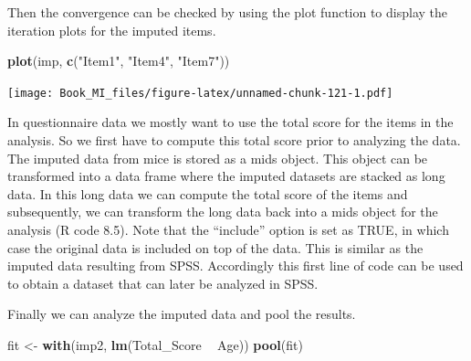 \documentclass[
]{book}
\newenvironment{Shaded}{\begin{snugshade}}{\end{snugshade}}
\newcommand{\DataTypeTok}[1]{\textcolor[rgb]{0.13,0.29,0.53}{#1}}
\newcommand{\DecValTok}[1]{\textcolor[rgb]{0.00,0.00,0.81}{#1}}
\newcommand{\KeywordTok}[1]{\textcolor[rgb]{0.13,0.29,0.53}{\textbf{#1}}}
\newcommand{\NormalTok}[1]{#1}
\newcommand{\OperatorTok}[1]{\textcolor[rgb]{0.81,0.36,0.00}{\textbf{#1}}}
\newcommand{\OtherTok}[1]{\textcolor[rgb]{0.56,0.35,0.01}{#1}}
\newcommand{\StringTok}[1]{\textcolor[rgb]{0.31,0.60,0.02}{#1}}
\begin{document}
Then the convergence can be checked by using the plot function to display the iteration plots for the imputed items.

\begin{Shaded}
\begin{Highlighting}[]
\KeywordTok{plot}\NormalTok{(imp, }\KeywordTok{c}\NormalTok{(}\StringTok{"Item1"}\NormalTok{, }\StringTok{"Item4"}\NormalTok{, }\StringTok{"Item7"}\NormalTok{))}
\end{Highlighting}
\end{Shaded}

\texttt{[image: Book\_MI\_files/figure-latex/unnamed-chunk-121-1.pdf]}

In questionnaire data we mostly want to use the total score for the items in the analysis. So we first have to compute this total score prior to analyzing the data. The imputed data from mice is stored as a mids object. This object can be transformed into a data frame where the imputed datasets are stacked as long data. In this long data we can compute the total score of the items and subsequently, we can transform the long data back into a mids object for the analysis (R code 8.5). Note that the ``include'' option is set as TRUE, in which case the original data is included on top of the data. This is similar as the imputed data resulting from SPSS. Accordingly this first line of code can be used to obtain a dataset that can later be analyzed in SPSS.

\begin{Shaded}
\end{Shaded}

Finally we can analyze the imputed data and pool the results.

\begin{Shaded}
\begin{Highlighting}[]
\NormalTok{fit <-}\StringTok{ }\KeywordTok{with}\NormalTok{(imp2, }\KeywordTok{lm}\NormalTok{(Total_Score }\OperatorTok{~}\StringTok{ }\NormalTok{Age))}
\KeywordTok{pool}\NormalTok{(fit)}
\end{Highlighting}
\end{Shaded}
\end{document}
